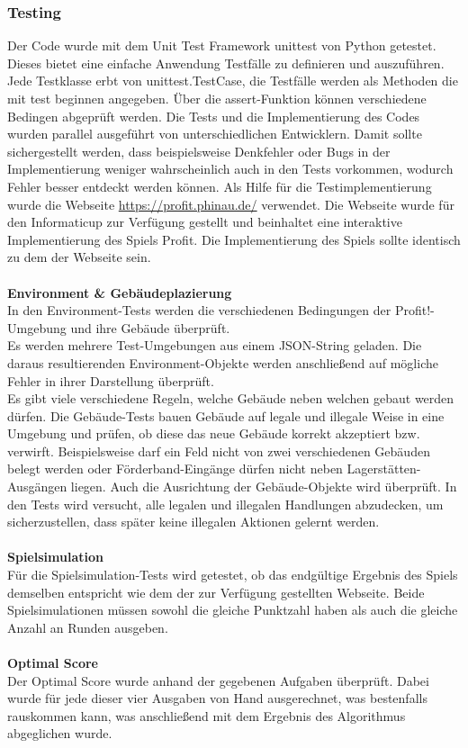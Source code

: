 \subsubsection{Testing}
Der Code wurde mit dem Unit Test Framework unittest von Python getestet. Dieses bietet eine einfache Anwendung Testfälle zu definieren und auszuführen. 
Jede Testklasse erbt von unittest.TestCase, die Testfälle werden als Methoden die mit test beginnen angegeben. Über die assert-Funktion können verschiedene Bedingen abgeprüft werden.
Die Tests und die Implementierung des Codes wurden parallel ausgeführt von unterschiedlichen Entwicklern. Damit sollte sichergestellt werden, dass beispielsweise Denkfehler oder Bugs in der Implementierung weniger wahrscheinlich auch in den Tests vorkommen, wodurch Fehler besser entdeckt werden können. 
Als Hilfe für die Testimplementierung wurde die Webseite \url{https://profit.phinau.de/}  verwendet. Die Webseite wurde für den Informaticup zur Verfügung gestellt und beinhaltet eine interaktive Implementierung des Spiels Profit. Die Implementierung des Spiels sollte identisch zu dem der Webseite sein.
\\\\
\textbf{Environment \& Gebäudeplazierung}\\
In den Environment-Tests werden die verschiedenen Bedingungen der \dq{}Profit!\dq{}-Umgebung und ihre Gebäude überprüft.
\\
Es werden mehrere Test-Umgebungen aus einem JSON-String geladen. Die daraus resultierenden Environment-Objekte werden anschließend auf mögliche Fehler in ihrer Darstellung überprüft.
\\
Es gibt viele verschiedene Regeln, welche Gebäude neben welchen gebaut werden dürfen. Die Gebäude-Tests bauen Gebäude auf legale und illegale Weise in eine Umgebung und prüfen, ob diese das neue Gebäude korrekt akzeptiert bzw. verwirft. 
Beispielsweise darf ein Feld nicht von zwei verschiedenen Gebäuden belegt werden oder Förderband-Eingänge dürfen nicht neben Lagerstätten-Ausgängen liegen. Auch die Ausrichtung der Gebäude-Objekte wird überprüft.
In den Tests wird versucht, alle legalen und illegalen Handlungen abzudecken, um sicherzustellen, dass später keine illegalen Aktionen gelernt werden. 
\\\\
\textbf{Spielsimulation}\\
Für die Spielsimulation-Tests wird getestet, ob das endgültige Ergebnis des Spiels demselben entspricht wie dem der zur Verfügung gestellten Webseite. Beide Spielsimulationen müssen sowohl die gleiche Punktzahl haben als auch die gleiche Anzahl an Runden ausgeben. 
\\\\
\textbf{Optimal Score}\\
Der Optimal Score wurde anhand der gegebenen Aufgaben überprüft. Dabei wurde für jede dieser vier Ausgaben von Hand ausgerechnet, was bestenfalls rauskommen kann, was anschließend mit dem Ergebnis des Algorithmus abgeglichen wurde.



